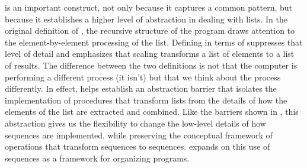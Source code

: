 \noindent
{} is an important construct, not only because it captures a common
pattern, but because it establishes a higher level of abstraction in dealing
with lists.  In the original definition of , the recursive
structure of the program draws attention to the element-by-element processing
of the list.  Defining  in terms of  suppresses that
level of detail and emphasizes that scaling transforms a list of elements to a
list of results.  The difference between the two definitions is not that the
computer is performing a different process (it isn't) but that we think about
the process differently.  In effect,  helps establish an abstraction
barrier that isolates the implementation of procedures that transform lists
from the details of how the elements of the list are extracted and combined.
Like the barriers shown in , this abstraction gives us the
flexibility to change the low-level details of how sequences are implemented,
while preserving the conceptual framework of operations that transform
sequences to sequences.   expands on this use of sequences
as a framework for organizing programs.

